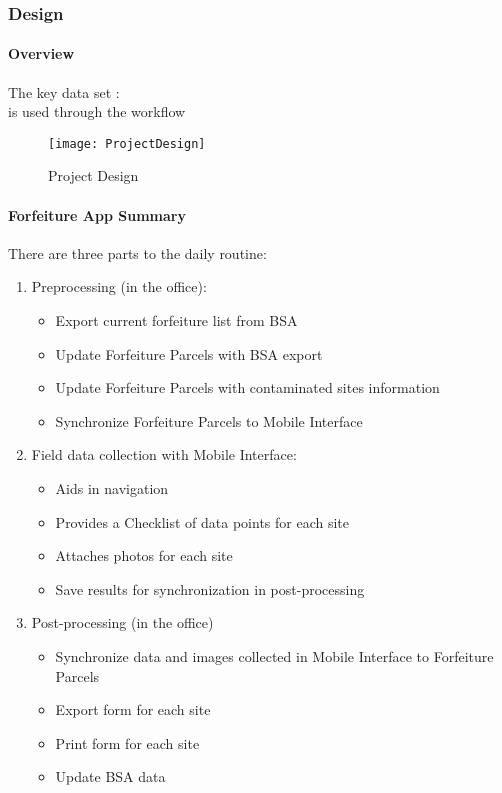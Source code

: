 \documentclass[class=book , crop=false, titlepage, twoside, multi={itemize, figure, verbatim}, float=false]{standalone}
\begin{document}
\subsubsection{Design}
\paragraph[Overview]{Overview}
\vspace{.20in}

\noindent The key data set : {}\\
is used through the workflow
%
%
\begin{figure}[h!]
\centering
    \texttt{[image: ProjectDesign]}
\caption{Project Design}
\end{figure}
\clearpage
%
%
%
\paragraph{Forfeiture App Summary}
\vspace{.25in}

There are three parts to the daily routine:
\begin{enumerate}
\item \Large Preprocessing \normalsize(in the office):
%
\begin{itemize}
\item Export current forfeiture list from BSA
\item Update Forfeiture Parcels with BSA export
\item Update Forfeiture Parcels with contaminated sites information
\item Synchronize Forfeiture Parcels to Mobile Interface
\end{itemize}
%
\item \Large Field data collection \normalsize with Mobile Interface:
%
\begin{itemize}
\item Aids in navigation
\item Provides a Checklist of data points for each site
\item Attaches photos for each site
\item Save results for synchronization in post-processing
\end{itemize}
%
\item \Large Post-processing \normalsize (in the office)
%
\begin{itemize}
\item Synchronize data and images collected in Mobile Interface to Forfeiture Parcels
\item Export form for each site
\item Print form for each site
\item Update BSA data
%
\end{itemize}
%
\end{enumerate}
%
\clearpage
%
%
%
\end{document}

